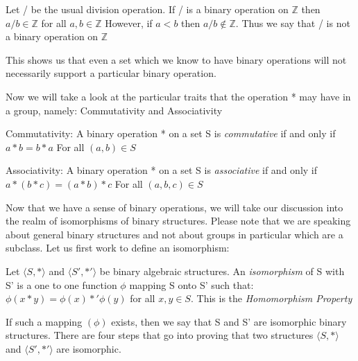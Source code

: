 \begin{example}
Let / be the usual division operation.
If / is a binary operation on $\mathbb{Z}$ then $a / b \in \mathbb{Z}$ for all $a,b \in \mathbb{Z}$ \newline
However, if $a < b$ then $a / b \notin \mathbb{Z}.$ \newline
Thus we say that / is not a binary operation on $\mathbb{Z}$
\end{example}

This shows us that even a set which we know to have binary operations will not necessarily support a particular binary operation.\newline

Now we will take a look at the particular traits that the operation * may have in a group, namely: Commutativity and Associativity

\begin{theorem}
Commutativity: A binary operation * on a set S is \emph{commutative} if and only if $a*b=b*a$ For all $(a,b) \in S$
\end{theorem}

\begin{theorem}
Associativity: A binary operation * on a set S is \emph{associative} if and only if $a*(b*c)=(a*b)*c$ For all $(a,b,c) \in S$
\end{theorem}

Now that we have a sense of binary operations, we will take our discussion into the realm of isomorphisms of binary structures. Please note that we are speaking about general binary structures and not about groups in particular which are a subclass. \newline
Let us first work to define an isomorphism:

\begin{definition}
Let $\langle S, * \rangle$ and $\langle S' , *' \rangle$ be binary algebraic structures. \newline
An \emph{isomorphism} of S with S' is a one to one function $\phi$ mapping S onto S' such that:\newline
$\phi (x*y)= \phi (x) *' \phi (y)$ for all $x,y \in S.$\newline
This is the \emph{Homomorphism Property}
\end{definition}

If such a mapping $(\phi)$ exists, then we say that S and S' are isomorphic binary structures. There are four steps that go into proving that two structures $\langle S, * \rangle$ and $\langle S' , *' \rangle$ are isomorphic.\newline

